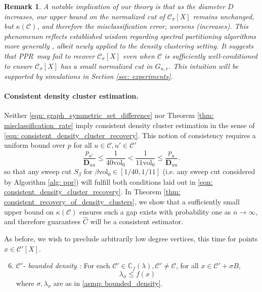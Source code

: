\documentclass{article}
\newcommand{\vol}{\mathrm{vol}}
\newcommand{\1}{\mathbf{1}}
\newcommand{\pbf}{p}        %
\newcommand{\Xbf}{X}             %
\newcommand{\Dbf}{\mathbf{D}}
\newcommand{\Cbb}{\mathbb{C}}
\newcommand{\Cset}{\mathcal{C}}
\newcommand{\Csig}{\Cset_{\sigma}}
\newcommand{\Cest}{\widehat{C}}
\newcommand{\pprspace}{{\sc PPR~}}
\theoremstyle{aldenthm}
\theoremstyle{aldenrmrk}
\newtheorem{remark}{Remark}
\begin{document}
\begin{remark}
	A notable implication of our theory is that as the diameter $D$ increases, our upper bound on the normalized cut of $\Csig[\Xbf]$ remains unchanged, but $\kappa(\Cset)$, and therefore the misclassification error, worsens (increases). This phenomenon reflects established wisdom regarding spectral partitioning algorithms more generally \cite{guattery1995, hein2010}, albeit newly applied to the density clustering setting. It suggests that \pprspace may fail to recover $\Csig[\Xbf]$ even when $\Cset$ is sufficiently well-conditioned to ensure $\Csig[\Xbf]$ has a small normalized cut in $G_{n,r}$. This intuition will be supported by simulations in Section \ref{sec: experiments}.
\end{remark}

\paragraph{Consistent density cluster estimation.}

Neither \eqref{eqn: graph_symmetric_set_difference} nor Theorem \ref{thm: misclassification_rate} imply consistent density cluster estimation in the sense of \eqref{eqn: consistent_density_cluster_recovery}. This notion of consistency requires a uniform bound over $\pbf$ for all $u \in \Cset, u' \in \Cset'$
\begin{equation}
\label{eqn: ppr_gap}
\frac{p_{u'}}{\Dbf_{uu}} \leq \frac{1}{40\vol_0} < \frac{1}{11\vol_0} \leq \frac{p_u}{\Dbf_{uu}}.
\end{equation}
so that any sweep cut $S_{\beta}$ for $\beta \vol_0 \in [1/40,1/11]$ (i.e. any sweep cut considered by Algorithm \ref{alg: ppr}) will fulfill both conditions laid out in \eqref{eqn: consistent_density_cluster_recovery}. In Theorem \ref{thm: consistent_recovery_of_density_clusters}, we show that a sufficiently small upper bound on $\kappa(\Cset)$ ensures such a gap exists with probability one as $n \to \infty$, and therefore guarantees $\Cest$ will be a consistent estimator.

As before, we wish to preclude arbitrarily low degree vertices, this time for points $x \in \Cset'[\Xbf]$.
\begin{enumerate}[label=(A\arabic*)]
	\setcounter{enumi}{5}
	\item 
	\label{asmp: C'_bounded_density}
	\emph{$\Cset'$- bounded density :} For each $\Cset' \in \Cbb_f(\lambda), \Cset' \neq \Cset$, for all $x \in \Cset' + \sigma B$,
	\begin{equation*}
	\lambda_{\sigma} \leq f(x)
	\end{equation*}
	where $\sigma,\lambda_{\sigma}$ are as in \ref{asmp: bounded_density}.
\end{enumerate}
\end{document}
